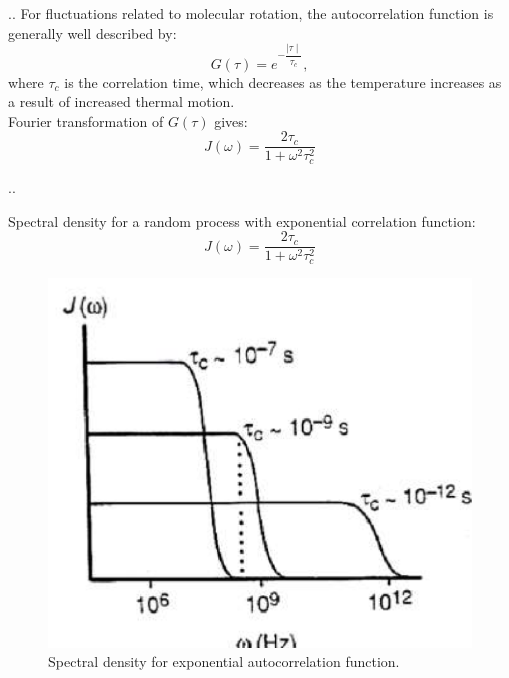 \documentclass{beamer}
\begin{document}
\begin{frame}{\thesection.\thesubsection. \insertsubsection}
	For fluctuations related to molecular rotation, the autocorrelation function is generally well described by:
	\begin{equation}
	G(\tau) = e^{- \dfrac{\mid \tau \mid}{\tau_c}},
	\end{equation}
	where $\tau_c$ is the correlation time, which decreases as the temperature increases as a result of increased thermal motion. \\
	Fourier transformation of $G(\tau)$ gives:
	\begin{equation}
	 J(\omega) = \dfrac{2 \tau_c}{1 + \omega^2 \tau_c^2}
	\end{equation}
	
\end{frame}

\begin{frame}{\thesection.\thesubsection. \insertsubsection}

	Spectral density for a random process with exponential correlation function:
	\begin{equation*}
     	J(\omega) = \dfrac{2 \tau_c}{1 + \omega^2 \tau_c^2}
	\end{equation*}
	\begin{figure}
	\centering
	\includegraphics[scale=0.3]{figures/spectral_density.png}
	\caption{Spectral density for exponential autocorrelation function.}
    \end{figure}

\end{frame}
\end{document}
